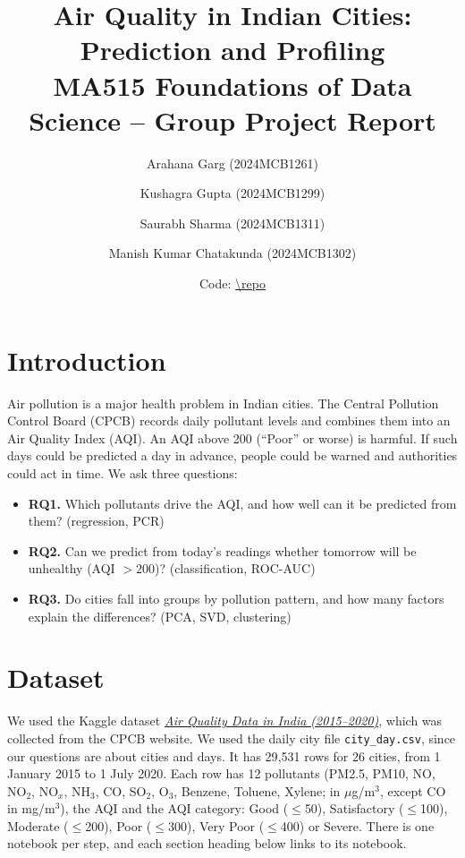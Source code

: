 \documentclass[10pt,a4paper]{article}
\title{\vspace{-1.4cm}\textbf{Air Quality in Indian Cities: Prediction and Profiling}\\[4pt]
\large MA515 Foundations of Data Science -- Group Project Report}
\author{Arahana Garg (2024MCB1261) \and Kushagra Gupta (2024MCB1299) \and Saurabh Sharma (2024MCB1311) \and Manish Kumar Chatakunda (2024MCB1302)}
\date{\small Code: \url{\repo}}
\newcommand{\lnk}[2]{\href{#1}{\color{blue!60!black}#2}}
\begin{document}
\maketitle
\vspace{-0.7cm}

\section{Introduction}
Air pollution is a major health problem in Indian cities. The Central Pollution Control Board (CPCB) records daily pollutant levels and combines them into an Air Quality Index (AQI). An AQI above 200 (``Poor'' or worse) is harmful. If such days could be predicted a day in advance, people could be warned and authorities could act in time. We ask three questions:
\begin{itemize}
\item \textbf{RQ1.} Which pollutants drive the AQI, and how well can it be predicted from them? (regression, PCR)
\item \textbf{RQ2.} Can we predict from today's readings whether tomorrow will be unhealthy (AQI $>200$)? (classification, ROC-AUC)
\item \textbf{RQ3.} Do cities fall into groups by pollution pattern, and how many factors explain the differences? (PCA, SVD, clustering)
\end{itemize}

\section{Dataset}
We used the Kaggle dataset \lnk{https://www.kaggle.com/datasets/rohanrao/air-quality-data-in-india}{\emph{Air Quality Data in India (2015--2020)}}, which was collected from the CPCB website. We used the daily city file \texttt{city\_day.csv}, since our questions are about cities and days. It has 29{,}531 rows for 26 cities, from 1 January 2015 to 1 July 2020. Each row has 12 pollutants (PM2.5, PM10, NO, NO$_2$, NO$_x$, NH$_3$, CO, SO$_2$, O$_3$, Benzene, Toluene, Xylene; in $\mu$g/m$^3$, except CO in mg/m$^3$), the AQI and the AQI category: Good ($\le$50), Satisfactory ($\le$100), Moderate ($\le$200), Poor ($\le$300), Very Poor ($\le$400) or Severe. There is one notebook per step, and each section heading below links to its notebook.

\end{document}
